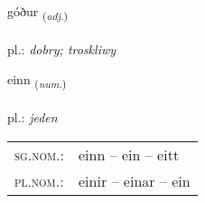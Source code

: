 \documentclass[frontgrid, backgrid]{flacards}\usepackage[]{graphicx}\usepackage[]{xcolor}
\begin{document}
\renewcommand{\flhead}{\vskip5pt \fboxsep=0pt {\small\bfseries\footnotesize Lýsingarorð | przymiotnik}}
\renewcommand{\fcfoot}{\vskip5pt \fboxsep=0pt \hspace{2pt}{\small\bfseries\footnotesize 1K}}

\renewcommand{\blhead}{\vskip5pt {\small\bfseries\footnotesize Lýsingarorð | przymiotnik }}
\renewcommand{\bcfoot}{\vskip5pt \hspace{2pt}{\small\bfseries\footnotesize 1K}}


{góður \small{\textsubscript{(\textit{adj.})}} \\[1ex] %
\textphonetic{[kouːðʏr]} \\
pl.: \emph{dobry; troskliwy} \\  [2ex]
\renewcommand*{\arraystretch}{0.8}
}

\renewcommand{\flhead}{\vskip5pt \fboxsep=0pt {\small\bfseries\footnotesize Töluorð | liczebnik}}
\renewcommand{\fcfoot}{\vskip5pt \fboxsep=0pt \hspace{2pt}{\small\bfseries\footnotesize 1K}}

\renewcommand{\blhead}{\vskip5pt {\small\bfseries\footnotesize Töluorð | liczebnik }}
\renewcommand{\bcfoot}{\vskip5pt \hspace{2pt}{\small\bfseries\footnotesize 1K}}


{einn \small{\textsubscript{(\textit{num.})}} \\[1ex] %
\textphonetic{[eitn̥]} \\
pl.: \emph{jeden} \\  [2ex]
\renewcommand*{\arraystretch}{0.8}
\begin{tabular}{ll}
\textsc{sg.nom.}: & einn  --  ein -- eitt \\ 
\textsc{pl.nom.}: & einir -- einar -- ein
\end{tabular}
}
\end{document}
